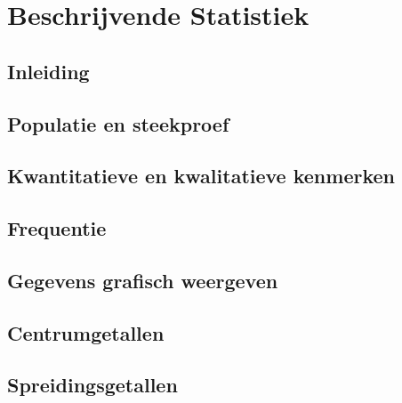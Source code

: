 \documentclass[11pt]{article}
\begin{document}
\section{Beschrijvende Statistiek}

\subsection{Inleiding}

\subsection{Populatie en steekproef}

\subsection{Kwantitatieve en kwalitatieve kenmerken}

\subsection{Frequentie}

\subsection{Gegevens grafisch weergeven}

\subsection{Centrumgetallen}

\subsection{Spreidingsgetallen}
\end{document}
